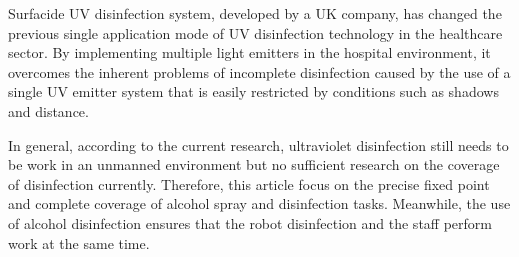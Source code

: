  
Surfacide UV disinfection system, developed by a UK company, has changed the previous single application mode of UV disinfection technology in the healthcare sector\cite{bedell_buchaklian_perlman_2016}. By implementing multiple light emitters in the hospital environment, it overcomes the inherent problems of incomplete disinfection caused by the use of a single UV emitter system that is easily restricted by conditions such as shadows and distance.


In general, according to the current research, ultraviolet disinfection still needs to be work in an unmanned environment but no sufficient research on the coverage of disinfection currently. Therefore, this article focus on the precise fixed point and complete coverage of alcohol spray and disinfection tasks. Meanwhile, the use of alcohol disinfection ensures that the robot disinfection and the staff perform work at the same time.
